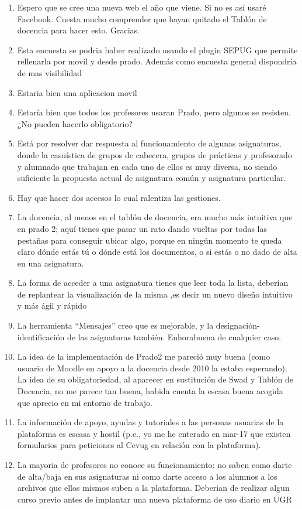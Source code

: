 \begin{enumerate}
\item Espero que se cree una nueva web el año que viene. Si no es así usaré Facebook. Cuesta mucho comprender que hayan quitado el Tablón de docencia para hacer esto. Gracias.
\item Esta encuesta se podria haber realizado usando el plugin SEPUG que permite rellenarla por movil y desde prado. Además como encuesta general dispondría de mas visibilidad
\item Estaria bien una aplicacion movil
\item Estaría bien que todos los profesores usaran Prado, pero algunos se resisten. ¿No pueden hacerlo obligatorio?
\item Está por resolver dar respuesta al funcionamiento de algunas asignaturas, donde la casuística de grupos de cabecera, grupos de prácticas y profesorado y alumnado que trabajan en cada uno de ellos es muy diversa, no siendo suficiente la propuesta actual de asignatura común y asignatura particular.
\item Hay que hacer dos accesos lo cual ralentiza las gestiones.
\item La docencia, al menos en el tablón de docencia, era mucho más intuitiva que en prado 2; aquí tienes que pasar un rato dando vueltas por todas las pestañas para conseguir ubicar algo, porque en ningún momento te queda claro dónde estás tú o dónde está los documentos, o si estás o no dado de alta en una asignatura.
\item La forma de acceder a una asignatura tienes que leer toda la lista, deberían de replantear la visualización de la misma ,es decir un nuevo diseño intuitivo y más ágil y rápido
\item La herramienta ``Mensajes'' creo que es mejorable, y la designación-identificación de las asignaturas también. Enhorabuena de cualquier caso.
\item La idea de la implementación de Prado2 me pareció muy buena (como usuario de Moodle en apoyo a la docencia desde 2010 la estaba esperando). La idea de su obligatoriedad, al aparecer en sustitución de Swad y Tablón de Docencia, no me parece tan buena, habida cuenta la escasa buena acogida que aprecio en mi entorno de trabajo.
\item La información de apoyo, ayudas y tutoriales a las personas usuarias de la plataforma es escasa y hostil (p.e., yo me he enterado en mar-17 que existen formularios para peticiones al Cevug en relación con la plataforma).
\item La mayoria de profesores no conoce su funcionamiento: no saben como darte de alta/baja en sus asignaturas ni como darte acceso a los alumnos a los archivos que ellos mismos suben a la plataforma. Deberian de realizar algun curso previo antes de implantar una nueva plataforma de uso diario en UGR

\end{enumerate}

